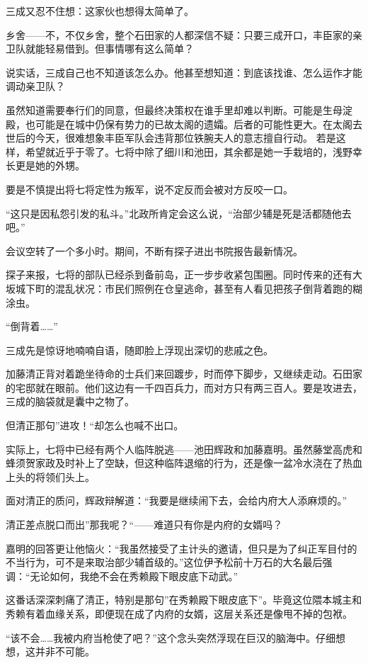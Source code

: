 \documentclass[
]{book}
\begin{document}
三成又忍不住想：这家伙也想得太简单了。

乡舍------不，不仅乡舍，整个石田家的人都深信不疑：只要三成开口，丰臣家的亲卫队就能轻易借到。但事情哪有这么简单？

说实话，三成自己也不知道该怎么办。他甚至想知道：到底该找谁、怎么运作才能调动亲卫队？

虽然知道需要奉行们的同意，但最终决策权在谁手里却难以判断。可能是生母淀殿，也可能是在城中仍保有势力的已故太阁的遗孀。后者的可能性更大。在太阁去世后的今天，很难想象丰臣军队会违背那位铁腕夫人的意志擅自行动。 若是这样，希望就近乎于零了。七将中除了细川和池田，其余都是她一手栽培的，浅野幸长更是她的外甥。

要是不慎提出将七将定性为叛军，说不定反而会被对方反咬一口。

``这只是因私怨引发的私斗。''北政所肯定会这么说，``治部少辅是死是活都随他去吧。''

会议空转了一个多小时。期间，不断有探子进出书院报告最新情况。

探子来报，七将的部队已经杀到备前岛，正一步步收紧包围圈。同时传来的还有大坂城下町的混乱状况：市民们照例在仓皇逃命，甚至有人看见把孩子倒背着跑的糊涂虫。

``倒背着\ldots\ldots{}''

三成先是惊讶地喃喃自语，随即脸上浮现出深切的悲戚之色。

加藤清正背对着跪坐待命的士兵们来回踱步，时而停下脚步，又继续走动。石田家的宅邸就在眼前。他们这边有一千四百兵力，而对方只有两三百人。要是攻进去，三成的脑袋就是囊中之物了。

但清正那句''进攻！``却怎么也喊不出口。

实际上，七将中已经有两个人临阵脱逃------池田辉政和加藤嘉明。虽然藤堂高虎和蜂须贺家政及时补上了空缺，但这种临阵退缩的行为，还是像一盆冷水浇在了热血上头的将领们头上。

面对清正的质问，辉政辩解道：``我要是继续闹下去，会给内府大人添麻烦的。''

清正差点脱口而出''那我呢？``------难道只有你是内府的女婿吗？

嘉明的回答更让他恼火：``我虽然接受了主计头的邀请，但只是为了纠正军目付的不当行为，可不是来取治部少辅首级的。''这位伊予松前十万石的大名最后强调：``无论如何，我绝不会在秀赖殿下眼皮底下动武。''

这番话深深刺痛了清正，特别是那句''在秀赖殿下眼皮底下''。毕竟这位隈本城主和秀赖有着血缘关系，即便现在成了内府的女婿，这层关系还是像甩不掉的包袱。

``该不会\ldots\ldots 我被内府当枪使了吧？''这个念头突然浮现在巨汉的脑海中。仔细想想，这并非不可能。
\end{document}
